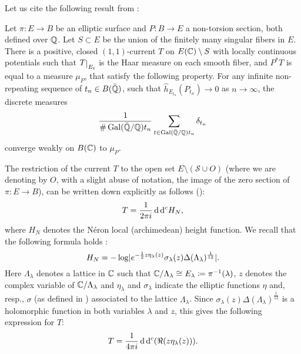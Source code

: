 \documentclass[a4paper,12pt]{article}
\theoremstyle{remark}
\begin{document}
Let us cite the following result from \cite[Section 3]{demarcomavraki}:
\begin{theorem}\label{Theo:demarcomavraki}
	Let $\pi:E \rightarrow B$ be an elliptic surface and $P : B \rightarrow E$ a non-torsion section, both defined over $\mathbb Q$. Let $S \subset E$ be the union of the finitely many singular fibers in $E$. There is a positive, closed $(1,1)$-current $T$ on $E(\mathbb C) \setminus S$ with locally continuous potentials such that $\restricts{T}{E_t}$ is the Haar measure on each smooth fiber, and $P^*T$ is equal to a measure $\mu_{P}$, that satisfy the following property. For any infinite non-repeating sequence of $t_n \in B(\bar{\mathbb Q})$, such that $\hat{h}_{E_{t_n}}(P_{t_n}) \rightarrow 0$ as $n \to \infty$, the discrete measures
	\[
	\frac{1}{\#\operatorname{Gal}(\bar{\mathbb Q}/\mathbb Q)t_n}\sum_{t \in \operatorname{Gal}(\bar{\mathbb Q}/\mathbb Q)t_n}\delta_{t_n}
	\]
	converge weakly on $B(\mathbb C)$ to $\mu_P$.
\end{theorem}



The restriction of the current $T$ to the open set $E \setminus (\mathcal{S} \cup O)$ (where we are denoting by $O$, with a slight abuse of notation, the image of the zero section of $\pi:E \rightarrow B$), can be written down explicitly as follows (\cite[Section 3.3]{demarcomavraki}):
\begin{equation}\label{Expr:11current}
	T=\frac{1}{2\pi i}\,\mathrm d \,\mathrm d^c {H_N},
\end{equation}
where $H_N$ denotes the Néron local (archimedean) height function. We recall that the following formula holds \cite[p. 466]{silverman1994advanced}:
\begin{equation}\label{Expr:altezzalocale}
	H_N=-\log \lvert e^{-\frac{1}{2}z\eta_{\lambda}(z)}\sigma_{\lambda}(z)\Delta(\Lambda_{\lambda})^{\frac{1}{12}}\rvert.
\end{equation}
Here $\Lambda_{\lambda}$ denotes a lattice in $\mathbb C$ such that $\mathbb C/\Lambda_{\lambda} \cong E_{\lambda} \coloneqq \pi^{-1}(\lambda)$, $z$ denotes the complex variable of $\mathbb C/\Lambda_{\lambda}$ and $\eta_{\lambda}$ and $\sigma_{\lambda}$ indicate the elliptic functions $\eta$ and, resp., $\sigma$ (as defined in \cite[VI.3.1,I.5.4]{silverman1994advanced}) associated to the lattice $\Lambda_{\lambda}$. Since $\sigma_{\lambda}(z)\Delta(\Lambda_{\lambda})^{\frac{1}{12}}$ is a holomorphic function in both variables $\lambda$ and $z$, this gives the following expression for $T$:
\begin{equation}\label{Expr:11current2}
	T=\frac{1}{4\pi i}\,\mathrm d \,\mathrm d^c(\Re (z\eta_{\lambda}(z))).
\end{equation}
\end{document}
